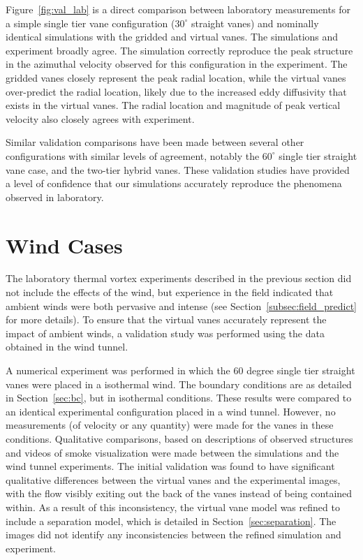Figure~\ref{fig:val_lab} is a direct comparison
between laboratory measurements for a simple single tier vane
configuration ($30^{\circ}$ straight vanes) and nominally identical
simulations with the gridded and 
virtual vanes. The simulations and experiment broadly agree. The
simulation correctly reproduce the peak structure in the azimuthal
velocity observed for this configuration in the experiment. The gridded
vanes closely represent the peak radial location, while the
virtual vanes over-predict the radial location, likely due to the
increased eddy diffusivity that exists in the virtual vanes. The radial
location and magnitude of peak vertical velocity also closely agrees
with experiment. 

Similar validation comparisons have been made between several other
configurations with similar levels of agreement,  notably the
$60^{\circ}$ single tier straight vane case, and the two-tier hybrid
vanes. 
These validation studies have provided a level of confidence that our
simulations accurately reproduce the phenomena observed in laboratory.


\section{Wind Cases}

The laboratory thermal vortex experiments described in the previous
section did not include the effects of the wind, but experience in
the field indicated that ambient winds were both pervasive and intense
(see Section~\ref{subsec:field_predict} for more details). To ensure that
the virtual vanes accurately represent the impact of ambient winds, a
validation study was performed using the data obtained in the wind
tunnel. 

A numerical experiment was performed in which the 60 degree single tier
straight vanes were placed in a isothermal wind. The boundary conditions
are as detailed in Section~\ref{sec:bc}, but in isothermal
conditions. These results were compared to an identical experimental
configuration placed in a wind tunnel. However, no measurements (of
velocity or any quantity) were made for the vanes in these
conditions. Qualitative comparisons, based on descriptions of observed
structures and videos of smoke visualization were made between the
simulations and the wind tunnel experiments. The initial validation was
found to have significant qualitative differences between the virtual
vanes and the experimental images, with the flow visibly exiting out the
back of the vanes instead of being contained within.  As a result of
this inconsistency, the virtual vane model was refined to include a
separation model, which is detailed in Section~\ref{sec:separation}. The
images  did not identify any inconsistencies between the refined
simulation and experiment.   


